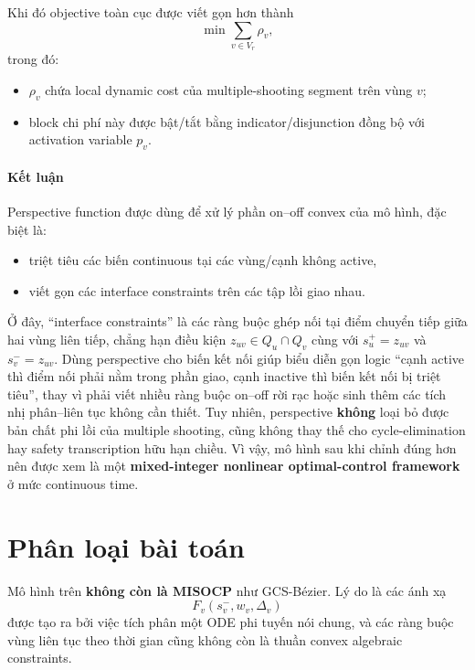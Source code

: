 \documentclass[12pt]{article}
\begin{document}
Khi đó objective toàn cục được viết gọn hơn thành
\begin{equation}
\min \sum_{v\in V_r} \rho_v,
\label{eq:recommended-clean-objective}
\end{equation}
trong đó:
\begin{itemize}
    \item $\rho_v$ chứa local dynamic cost của multiple-shooting segment trên vùng $v$;
    \item block chi phí này được bật/tắt bằng indicator/disjunction đồng bộ với activation variable $p_v$.
\end{itemize}

\paragraph{Kết luận}
Perspective function được dùng để xử lý phần on--off convex của mô hình, đặc biệt là:
\begin{itemize}
    \item triệt tiêu các biến continuous tại các vùng/cạnh không active,
    \item viết gọn các interface constraints trên các tập lồi giao nhau.
\end{itemize}
Ở đây, ``interface constraints'' là các ràng buộc ghép nối tại điểm chuyển tiếp giữa hai vùng liên tiếp, chẳng hạn điều kiện $z_{uv}\in Q_u\cap Q_v$ cùng với $s_u^+=z_{uv}$ và $s_v^-=z_{uv}$. Dùng perspective cho biến kết nối giúp biểu diễn gọn logic ``cạnh active thì điểm nối phải nằm trong phần giao, cạnh inactive thì biến kết nối bị triệt tiêu'', thay vì phải viết nhiều ràng buộc on--off rời rạc hoặc sinh thêm các tích nhị phân--liên tục không cần thiết.
Tuy nhiên, perspective \textbf{không} loại bỏ được bản chất phi lồi của multiple shooting, cũng không thay thế cho cycle-elimination hay safety transcription hữu hạn chiều. Vì vậy, mô hình sau khi chỉnh đúng hơn nên được xem là một \textbf{mixed-integer nonlinear optimal-control framework} ở mức continuous time.

\section{Phân loại bài toán}

Mô hình trên \textbf{không còn là MISOCP} như GCS-B\'ezier. Lý do là các ánh xạ
\[
F_v(s_v^-,w_v,\Delta_v)
\]
được tạo ra bởi việc tích phân một ODE phi tuyến nói chung, và các ràng buộc vùng liên tục theo thời gian cũng không còn là thuần convex algebraic constraints.
\end{document}
